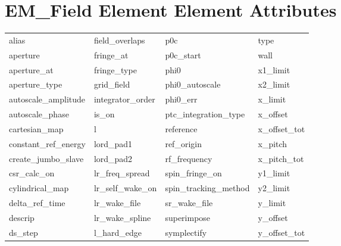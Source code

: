  \section{EM_Field Element Element Attributes}
 \label{s:list.em.field}
 
 \begin{tabular}{llll} \toprule
alias                       & field_overlaps              & p0c                         & type                        \\
aperture                    & fringe_at                   & p0c_start                   & wall                        \\
aperture_at                 & fringe_type                 & phi0                        & x1_limit                    \\
aperture_type               & grid_field                  & phi0_autoscale              & x2_limit                    \\
autoscale_amplitude         & integrator_order            & phi0_err                    & x_limit                     \\
autoscale_phase             & is_on                       & ptc_integration_type        & x_offset                    \\
cartesian_map               & l                           & reference                   & x_offset_tot                \\
constant_ref_energy         & lord_pad1                   & ref_origin                  & x_pitch                     \\
create_jumbo_slave          & lord_pad2                   & rf_frequency                & x_pitch_tot                 \\
csr_calc_on                 & lr_freq_spread              & spin_fringe_on              & y1_limit                    \\
cylindrical_map             & lr_self_wake_on             & spin_tracking_method        & y2_limit                    \\
delta_ref_time              & lr_wake_file                & sr_wake_file                & y_limit                     \\
descrip                     & lr_wake_spline              & superimpose                 & y_offset                    \\
ds_step                     & l_hard_edge                 & symplectify                 & y_offset_tot                \\

\end{tabular}
